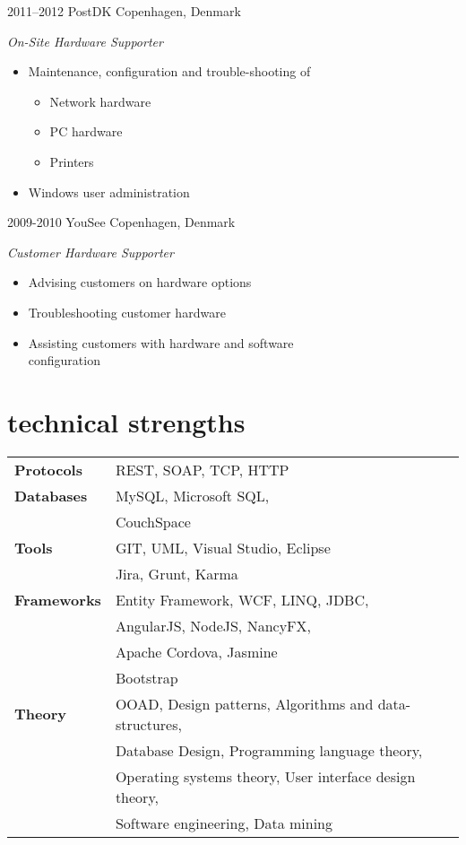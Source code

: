 \documentclass[]{friggeri-cv} %
\begin{document}
\begin{entrylist}
\entry
{2011--2012}
{PostDK}
{Copenhagen, Denmark}
{\emph{On-Site Hardware Supporter}
\begin{itemize}
	\item Maintenance, configuration and trouble-shooting of
			\begin{itemize}
				\item Network hardware
				\item PC hardware
				\item Printers
			\end{itemize}
	\item Windows user administration
\end{itemize}}
\entry
{2009-2010}
{YouSee}
{Copenhagen, Denmark}
{\emph{Customer Hardware Supporter}
\begin{itemize}
	\item Advising customers on hardware options
	\item Troubleshooting customer hardware
	\item Assisting customers with hardware and software\\configuration
\end{itemize}}
\end{entrylist}

\section{technical strengths}


\begin{tabular}{p{3cm} l}
	\textbf{Protocols} & REST, SOAP, TCP, HTTP \\
	\textbf{Databases} & MySQL, Microsoft SQL, \\
					   & CouchSpace \\
	\textbf{Tools} & GIT, UML, Visual Studio, Eclipse \\
				   & Jira, Grunt, Karma \\
	\textbf{Frameworks} & Entity Framework, WCF, LINQ, JDBC, \\
						& AngularJS, NodeJS, NancyFX, \\
						& Apache Cordova, Jasmine \\
						& Bootstrap \\
	\textbf{Theory} & OOAD, Design patterns, Algorithms and data-structures, \\
					& Database Design, Programming language theory, \\ 
					& Operating systems theory, User interface design theory, \\
					& Software engineering, Data mining

\end{tabular}
\end{document}
